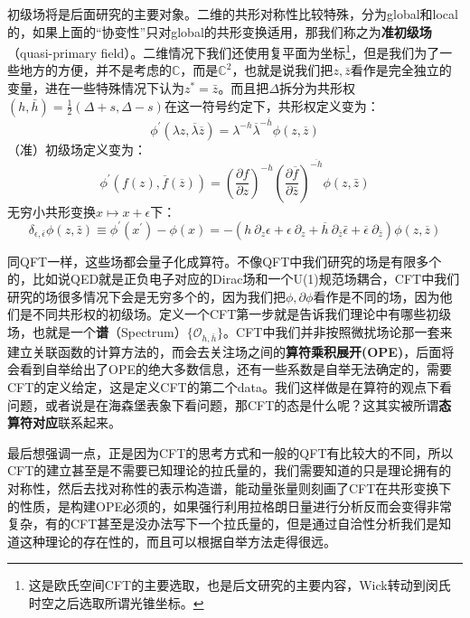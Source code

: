 初级场将是后面研究的主要对象。二维的共形对称性比较特殊，分为global和local的，如果上面的“协变性”只对global的共形变换适用，那我们称之为\textbf{准初级场}（quasi-primary field）。二维情况下我们还使用复平面为坐标\footnote{这是欧氏空间CFT的主要选取，也是后文研究的主要内容，Wick转动到闵氏时空之后选取所谓光锥坐标。}，但是我们为了一些地方的方便，并不是考虑的$\mathbb{C}$，而是$\mathbb{C}^2$，也就是说我们把$z,\bar z$看作是完全独立的变量，进在一些特殊情况下认为$z^*=\bar z$。而且把$\Delta$拆分为共形权$(h,\bar h)=\frac{1}{2}\left(\Delta+s,\Delta-s\right)$在这一符号约定下，共形权定义变为：
\begin{equation}
	\boxed{
	\phi^{\prime}(\lambda z,\overline{\lambda}\overline{z})=\lambda^{-h}\overline{\lambda}^{-\overline{h}}\phi(z,\overline{z})
	}
\end{equation}
（准）初级场定义变为：
\begin{equation}
	\boxed{
		\phi^{\prime}\left(f(z),\overline{f}(\overline{z})\right)=\left(\frac{\partial f}{\partial z}\right)^{-h}\left(\frac{\partial\overline{f}}{\partial\bar{z}}\right)^{\overline{-h}}\phi(z,\bar{z})
	}
\end{equation}
无穷小共形变换$x\mapsto x+\epsilon$下：
\begin{equation}
	\boxed{
	\delta_{\epsilon,\bar{\epsilon}}\phi(z,\bar{z})\equiv\phi^\prime(x^\prime)-\phi(x)=-\left(h\mathrm{~}\partial_z\epsilon+\epsilon\mathrm{~}\partial_z+\overline{h}\mathrm{~}\partial_{\bar{z}}\bar{\epsilon}+\overline{\epsilon}\mathrm{~}\partial_{\bar{z}}\right)\phi(z,\overline{z})
	}
\end{equation}

同QFT一样，这些场都会量子化成算符。不像QFT中我们研究的场是有限多个的，比如说QED就是正负电子对应的Dirac场和一个U(1)规范场耦合，CFT中我们研究的场很多情况下会是无穷多个的，因为我们把$\phi,\partial\phi$看作是不同的场，因为他们是不同共形权的初级场。定义一个CFT第一步就是告诉我们理论中有哪些初级场，也就是一个\textbf{谱}（Spectrum）$\{\mathcal{O}_{h,\bar h}\}$。CFT中我们并非按照微扰场论那一套来建立关联函数的计算方法的，而会去关注场之间的\textbf{算符乘积展开(OPE)}，后面将会看到自举给出了OPE的绝大多数信息，还有一些系数是自举无法确定的，需要CFT的定义给定，这是定义CFT的第二个data。我们这样做是在算符的观点下看问题，或者说是在海森堡表象下看问题，那CFT的态是什么呢？这其实被所谓\textbf{态算符对应}联系起来。

最后想强调一点，正是因为CFT的思考方式和一般的QFT有比较大的不同，所以CFT的建立甚至是不需要已知理论的拉氏量的，我们需要知道的只是理论拥有的对称性，然后去找对称性的表示构造谱，能动量张量则刻画了CFT在共形变换下的性质，是构建OPE必须的，如果强行利用拉格朗日量进行分析反而会变得非常复杂，有的CFT甚至是没办法写下一个拉氏量的，但是通过自洽性分析我们是知道这种理论的存在性的，而且可以根据自举方法走得很远。

